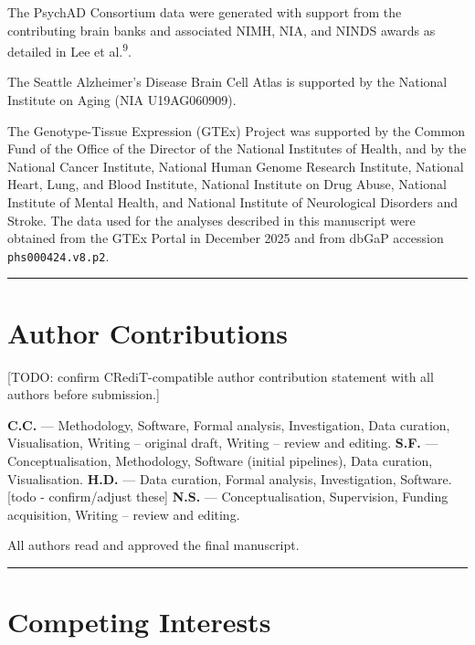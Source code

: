 \documentclass[
]{article}
\begin{document}
The PsychAD Consortium data were generated with support from the
contributing brain banks and associated NIMH, NIA, and NINDS awards as
detailed in Lee et al.\textsuperscript{9}.

The Seattle Alzheimer's Disease Brain Cell Atlas is supported by the
National Institute on Aging (NIA U19AG060909).

The Genotype-Tissue Expression (GTEx) Project was supported by the
Common Fund of the Office of the Director of the National Institutes of
Health, and by the National Cancer Institute, National Human Genome
Research Institute, National Heart, Lung, and Blood Institute, National
Institute on Drug Abuse, National Institute of Mental Health, and
National Institute of Neurological Disorders and Stroke. The data used
for the analyses described in this manuscript were obtained from the
GTEx Portal in December 2025 and from dbGaP accession
\texttt{phs000424.v8.p2}.

\begin{center}\rule{0.5\linewidth}{0.5pt}\end{center}

\section{Author Contributions}\label{author-contributions}

{[}TODO: confirm CRediT-compatible author contribution statement with
all authors before submission.{]}

\textbf{C.C.} --- Methodology, Software, Formal analysis, Investigation,
Data curation, Visualisation, Writing -- original draft, Writing --
review and editing. \textbf{S.F.} --- Conceptualisation, Methodology,
Software (initial pipelines), Data curation, Visualisation.
\textbf{H.D.} --- Data curation, Formal analysis, Investigation,
Software. {[}todo - confirm/adjust these{]} \textbf{N.S.} ---
Conceptualisation, Supervision, Funding acquisition, Writing -- review
and editing.

All authors read and approved the final manuscript.

\begin{center}\rule{0.5\linewidth}{0.5pt}\end{center}

\section{Competing Interests}\label{competing-interests}
\end{document}
